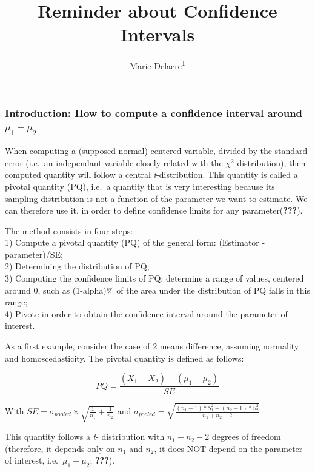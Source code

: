 \documentclass[
  man,floatsintext]{apa6}
\affiliation{
\vspace{0.5cm}
\textsuperscript{1} ULB}
\title{Reminder about Confidence Intervals}
\author{Marie Delacre\textsuperscript{1}}
\date{}
\begin{document}
\maketitle

\hypertarget{introduction-how-to-compute-a-confidence-interval-around-mu_1-mu_2}{%
\subsubsection{\texorpdfstring{Introduction: How to compute a confidence interval around \(\mu_1-\mu_2\)}{Introduction: How to compute a confidence interval around \textbackslash mu\_1-\textbackslash mu\_2}}\label{introduction-how-to-compute-a-confidence-interval-around-mu_1-mu_2}}

When computing a (supposed normal) centered variable, divided by the standard error (i.e.~an independant variable closely related with the \(\chi^2\) distribution), then computed quantity will follow a central \emph{t}-distribution. This quantity is called a pivotal quantity (PQ), i.e.~a quantity that is very interesting because its sampling distribution is not a function of the parameter we want to estimate. We can therefore use it, in order to define confidence limits for any parameter({\textbf{???}}).

The method consists in four steps:\\
1) Compute a pivotal quantity (PQ) of the general form: (Estimator - parameter)/SE;\\
2) Determining the distribution of PQ;\\
3) Computing the confidence limits of PQ: determine a range of values, centered around 0, such as (1-alpha)\% of the area under the distribution of PQ falls in this range;\\
4) Pivote in order to obtain the confidence interval around the parameter of interest.

As a first example, consider the case of 2 means difference, assuming normality and homoscedasticity. The pivotal quantity is defined as follows:

\begin{equation} 
PQ= \frac{(\bar{X_1}-\bar{X_2})-(\mu_1-\mu_2)}{SE}
\label{eq:PQstudent}
\end{equation}

With \(SE = \sigma_{pooled} \times \sqrt{\frac{1}{n_1}+\frac{1}{n_2}}\) and \(\sigma_{pooled} = \sqrt{\frac{(n_1-1)*S^2_1+(n_2-1)*S^2_2}{n_1+n_2-2}}\)

This quantity follows a \emph{t}- distribution with \(n_1+n_2-2\) degrees of freedom (therefore, it depends only on \(n_1\) and \(n_2\), it does NOT depend on the parameter of interest, i.e.~\(\mu_1-\mu_2\); {\textbf{???}}).
\end{document}

